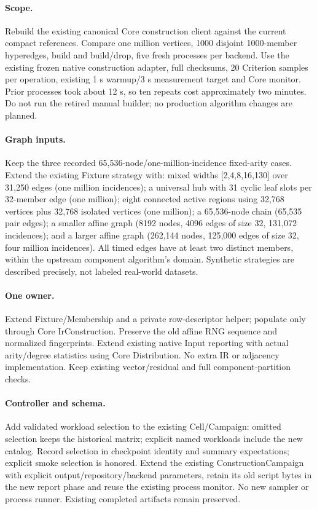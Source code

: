 \documentclass[11pt]{article}
\begin{document}
\paragraph{Scope.} Rebuild the existing canonical Core construction client against
the current compact references. Compare one million vertices, 1000 disjoint
1000-member hyperedges, build and build/drop, five fresh processes per backend.
Use the existing frozen native construction adapter, full checksums, 20 Criterion
samples per operation, existing 1 s warmup/3 s measurement target and Core monitor.
Prior processes took about 12 s, so ten repeats cost approximately two minutes.
Do not run the retired manual builder; no production algorithm changes are planned.
\paragraph{Graph inputs.} Keep the three recorded 65,536-node/one-million-incidence
fixed-arity cases. Extend the existing Fixture strategy with: mixed widths
[2,4,8,16,130] over 31,250 edges (one million incidences); a universal hub with
31 cyclic leaf slots per 32-member edge (one million); eight connected active
regions using 32,768 vertices plus 32,768 isolated vertices (one million);
a 65,536-node chain (65,535 pair edges); a smaller affine graph (8192 nodes,
4096 edges of size 32, 131,072 incidences); and a larger affine graph (262,144
nodes, 125,000 edges of size 32, four million incidences). All timed edges have
at least two distinct members, within the upstream component algorithm's domain.
Synthetic strategies are described precisely, not labeled real-world datasets.
\paragraph{One owner.} Extend Fixture/Membership and a private row-descriptor
helper; populate only through Core IrConstruction. Preserve the old affine RNG
sequence and normalized fingerprints. Extend existing native Input reporting with
actual arity/degree statistics using Core Distribution. No extra IR or adjacency
implementation. Keep existing vector/residual and full component-partition checks.
\paragraph{Controller and schema.} Add validated workload selection to the existing
Cell/Campaign: omitted selection keeps the historical matrix; explicit named
workloads include the new catalog. Record selection in checkpoint identity and
summary expectations; explicit smoke selection is honored. Extend the existing
ConstructionCampaign with explicit output/repository/backend parameters, retain
its old script bytes in the new report phase and reuse the existing process monitor.
No new sampler or process runner. Existing completed artifacts remain preserved.
\end{document}
